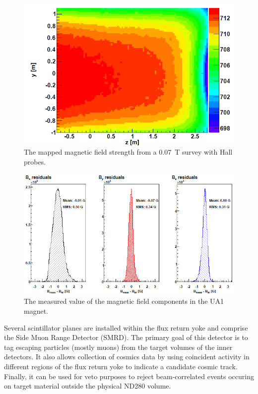 \begin{figure}
\begin{center}
\includegraphics[width=6in]{./Figures/magneticfield.png}
\end{center}
\caption{The mapped magnetic field strength from a 0.07~T survey with
  Hall probes.}
\label{fig:magneticfield}
\end{figure}

\begin{figure}
\begin{center}
\includegraphics[width=6in]{./Figures/magneticfield2.png}
\end{center}
\caption{The measured value of the magnetic field components in the
  UA1 magnet.}
\label{fig:magneticfield2}
\end{figure}

Several scintillator planes are installed within the flux return yoke
and comprise the Side Muon Range Detector (SMRD). The primary goal of
this detector is to tag escaping particles (mostly muons) from the target volumes of
the inner detectors. It also allows collection of cosmics data by
using coincident activity in different regions of the flux return yoke
to indicate a candidate cosmic track. Finally, it can be used for veto
purposes to reject beam-correlated events occuring on target material outside
the physical ND280 volume. 

